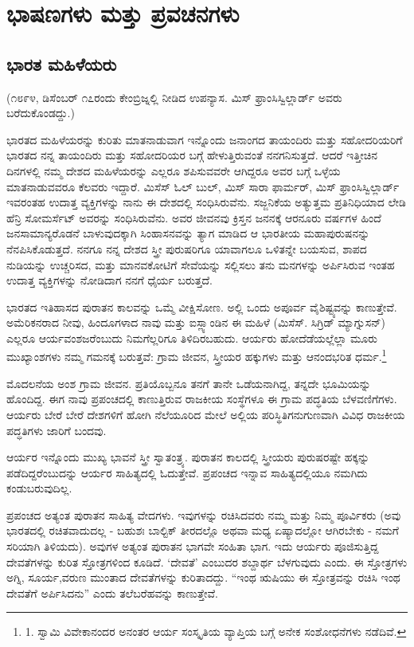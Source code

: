 
\part{ಭಾಷಣಗಳು ಮತ್ತು ಪ್ರವಚನಗಳು}


\chapter{ಭಾರತ ಮಹಿಳೆಯರು}

(೧೮೯೪, ಡಿಸೆಂಬರ್ ೧೭ರಂದು ಕೇಂಬ್ರಿಜ್ನಲ್ಲಿ ನೀಡಿದ ಉಪನ್ಯಾಸ. ಮಿಸ್ ಫ್ರಾಂಸಿಸ್ವಿಲ್ಲಾರ್ಡ್ ಅವರು ಬರೆದುಕೊಂಡದ್ದು.)

ಭಾರತದ ಮಹಿಳೆಯರನ್ನು ಕುರಿತು ಮಾತನಾಡುವಾಗ ಇನ್ನೊಂದು ಜನಾಂಗದ ತಾಯಂದಿರು ಮತ್ತು ಸಹೋದರಿಯರಿಗೆ ಭಾರತದ ನನ್ನ ತಾಯಂದಿರು ಮತ್ತು ಸಹೋದರಿಯರ ಬಗ್ಗೆ ಹೇಳುತ್ತಿರುವಂತೆ ನನಗನಿಸುತ್ತದೆ. ಆದರೆ ಇತ್ತೀಚಿನ ದಿನಗಳಲ್ಲಿ ನಮ್ಮ ದೇಶದ ಮಹಿಳೆಯರನ್ನು ಎಲ್ಲರೂ ಶಪಿಸುವವರೇ ಆಗಿದ್ದರೂ ಅವರ ಬಗ್ಗೆ ಒಳ್ಳೆಯ ಮಾತನಾಡುವವರೂ ಕೆಲವರು ಇದ್ದಾರೆ. ಮಿಸೆಸ್ ಓಲ್ ಬುಲ್, ಮಿಸ್ ಸಾರಾ ಫಾರ್ಮರ್, ಮಿಸ್ ಫ್ರಾಂಸಿಸ್ವಿಲ್ಲಾರ್ಡ್ ಇವರಂತಹ ಉದಾತ್ತ ವ್ಯಕ್ತಿಗಳನ್ನು ನಾನು ಈ ದೇಶದಲ್ಲಿ ಸಂಧಿಸಿರುವೆನು. ಸಜ್ಜನಿಕೆಯ ಅತ್ಯುತ್ತಮ ಪ್ರತಿನಿಧಿಯಾದ ಲೇಡಿ ಹೆನ್ರಿ ಸೋಮರ್ಸೆಟ್ ಅವರನ್ನು ಸಂಧಿಸಿರುವೆನು. ಅವರ ಜೀವನವು ಕ್ರಿಸ್ತನ ಜನನಕ್ಕೆ ಆರನೂರು ವರ್ಷಗಳ ಹಿಂದೆ ಜನಸಾಮಾನ್ಯರೊಡನೆ ಬಾಳುವುದಕ್ಕಾಗಿ ಸಿಂಹಾಸನವನ್ನು ತ್ಯಾಗ ಮಾಡಿದ ಆ ಭಾರತೀಯ ಮಹಾಪುರುಷನನ್ನು ನೆನಪಿಸಿಕೊಡುತ್ತದೆ. ನನಗೂ ನನ್ನ ದೇಶದ ಸ್ತ್ರೀ ಪುರುಷರಿಗೂ ಯಾವಾಗಲೂ ಒಳಿತನ್ನೇ ಬಯಸುವ, ಶಾಪದ ನುಡಿಯನ್ನು ಉಚ್ಚರಿಸದ, ಮತ್ತು ಮಾನವಕೋಟಿಗೆ ಸೇವೆಯನ್ನು ಸಲ್ಲಿಸಲು ತನು ಮನಗಳನ್ನು ಅರ್ಪಿಸಿರುವ ಇಂತಹ ಉದಾತ್ತ ವ್ಯಕ್ತಿಗಳನ್ನು ನೋಡಿದಾಗ ನನಗೆ ಧೈರ್ಯ ಬರುತ್ತದೆ.

ಭಾರತದ ಇತಿಹಾಸದ ಪುರಾತನ ಕಾಲವನ್ನು ಒಮ್ಮೆ ವೀಕ್ಷಿಸೋಣ. ಅಲ್ಲಿ ಒಂದು ಅಪೂರ್ವ ವೈಶಿಷ್ಟ್ಯವನ್ನು ಕಾಣುತ್ತೇವೆ. ಅಮೆರಿಕನರಾದ ನೀವು, ಹಿಂದೂಗಳಾದ ನಾವು ಮತ್ತು ಐಸ್ಲ್ಯಾಂಡಿನ ಈ ಮಹಿಳೆ (ಮಿಸೆಸ್. ಸಿಗ್ರಿಡ್ ಮ್ಯಾಗ್ನುಸನ್) ಎಲ್ಲರೂ ಆರ್ಯವಂಶಜರೆಂಬುದು ನಿಮಗೆಲ್ಲರಿಗೂ ತಿಳಿದಿರಬಹುದು. ಆರ್ಯರು ಹೋದೆಡೆಯಲ್ಲೆಲ್ಲಾ ಮೂರು ಮುಖ್ಯಾಂಶಗಳು ನಮ್ಮ ಗಮನಕ್ಕೆ ಬರುತ್ತವೆ: ಗ್ರಾಮ ಜೀವನ, ಸ್ತ್ರೀಯರ ಹಕ್ಕುಗಳು ಮತ್ತು ಆನಂದಭರಿತ ಧರ್ಮ.\footnote{1. ಸ್ವಾಮಿ ವಿವೇಕಾನಂದರ ಅನಂತರ ಆರ್ಯ ಸಂಸ್ಕೃತಿಯ ವ್ಯಾಪ್ತಿಯ ಬಗ್ಗೆ ಅನೇಕ ಸಂಶೋಧನೆಗಳು ನಡೆದಿವೆ.}

ಮೊದಲನೆಯ ಅಂಶ ಗ್ರಾಮ ಜೀವನ. ಪ್ರತಿಯೊಬ್ಬನೂ ತನಗೆ ತಾನೇ ಒಡೆಯನಾಗಿದ್ದ, ತನ್ನದೇ ಭೂಮಿಯನ್ನು ಹೊಂದಿದ್ದ. ಈಗ ನಾವು ಪ್ರಪಂಚದಲ್ಲಿ ಕಾಣುತ್ತಿರುವ ರಾಜಕೀಯ ಸಂಸ್ಥೆಗಳೂ ಈ ಗ್ರಾಮ ಪದ್ಧತಿಯ ಬೆಳವಣಿಗೆಗಳು. ಆರ್ಯರು ಬೇರೆ ಬೇರೆ ದೇಶಗಳಿಗೆ ಹೋಗಿ ನೆಲೆಯೂರಿದ ಮೇಲೆ ಅಲ್ಲಿಯ ಪರಿಸ್ಥಿತಿಗನುಗುಣವಾಗಿ ವಿವಿಧ ರಾಜಕೀಯ ಪದ್ಧತಿಗಳು ಜಾರಿಗೆ ಬಂದವು.

ಆರ್ಯರ ಇನ್ನೊಂದು ಮುಖ್ಯ ಭಾವನೆ ಸ್ತ್ರೀ ಸ್ವಾತಂತ್ರ್ಯ. ಪುರಾತನ ಕಾಲದಲ್ಲಿ ಸ್ತ್ರೀಯರು ಪುರುಷರಷ್ಟೇ ಹಕ್ಕನ್ನು ಪಡೆದಿದ್ದರೆಂಬುದನ್ನು ಆರ್ಯರ ಸಾಹಿತ್ಯದಲ್ಲಿ ಓದುತ್ತೇವೆ. ಪ್ರಪಂಚದ ಇನ್ನಾವ ಸಾಹಿತ್ಯದಲ್ಲಿಯೂ ನಮಗಿದು ಕಂಡುಬರುವುದಿಲ್ಲ.

ಪ್ರಪಂಚದ ಅತ್ಯಂತ ಪುರಾತನ ಸಾಹಿತ್ಯ ವೇದಗಳು. ಇವುಗಳನ್ನು ರಚಿಸಿದವರು ನಮ್ಮ ಮತ್ತು ನಿಮ್ಮ ಪೂರ್ವಿಕರು (ಅವು ಭಾರತದಲ್ಲಿ ರಚಿತವಾದುದಲ್ಲ - ಬಹುಶಃ ಬಾಲ್ಟಿಕ್ ತೀರದಲ್ಲೊ ಅಥವಾ ಮಧ್ಯ ಏಷ್ಯಾದಲ್ಲೋ ಆಗಿರಬೇಕು - ನಮಗೆ ಸರಿಯಾಗಿ ತಿಳಿಯದು). ಅವುಗಳ ಅತ್ಯಂತ ಪುರಾತನ ಭಾಗವೇ ಸಂಹಿತಾ ಭಾಗ. ಇದು ಆರ್ಯರು ಪೂಜಿಸುತ್ತಿದ್ದ ದೇವತೆಗಳನ್ನು ಕುರಿತ ಸ್ತೋತ್ರಗಳಿಂದ ಕೂಡಿದೆ. ‘ದೇವತೆ’ ಎಂಬುದರ ಶಬ್ದಾರ್ಥ ಬೆಳಗುವುದು ಎಂದು. ಈ ಸ್ತೋತ್ರಗಳು ಅಗ್ನಿ, ಸೂರ್ಯ,ವರುಣ ಮುಂತಾದ ದೇವತೆಗಳನ್ನು ಕುರಿತಾದದ್ದು. “ಇಂಥ ಋಷಿಯು ಈ ಸ್ತೋತ್ರವನ್ನು ರಚಿಸಿ ಇಂಥ ದೇವತೆಗೆ ಅರ್ಪಿಸಿದನು” ಎಂದು ತಲೆಬರೆಹವನ್ನು ಕಾಣುತ್ತೇವೆ.

